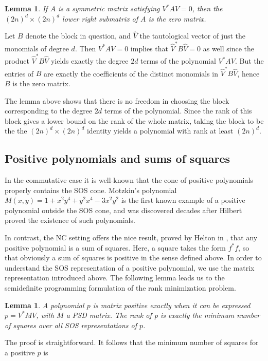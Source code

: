 \documentclass[11pt]{amsart}
\newtheorem{lemma}[theorem]{Lemma}
\begin{document}
\begin{lemma}
If $A$ is a symmetric matrix satisfying $V^*AV=0$, then the $(2n)^d\times (2n)^d$ lower right submatrix of $A$ is the zero matrix.
\end{lemma}

\proof Let $B$ denote the block in question, and $\hat V$ the tautological vector of just the monomials of degree $d$. Then $V^*AV=0$ implies that $\hat V^* B \hat V=0$ as well since the product $\hat V^* B \hat V$ yields exactly the degree $2d$ terms of the polynomial $V^*AV$. But the entries of $B$ are exactly the coefficients of the distinct monomials in $\hat V^*B\hat V$, hence $B$ is the zero matrix.

The lemma above shows that there is no freedom in choosing the block corresponding to the degree $2d$ terms of the polynomial. Since the rank of this block gives a lower bound on the rank of the whole matrix, taking the block to be the the $(2n)^d\times (2n)^d$ identity yields a polynomial with rank at least $(2n)^d$.
\subsection{Positive polynomials and sums of squares}
In the commutative case it is well-known that the cone of positive polynomials properly contains the SOS cone. Motzkin's polynomial $M(x,y)=1+x^2y^4+y^2x^4-3x^2y^2$ is the first known example of a positive polynomial outside the SOS cone, and was discovered decades after Hilbert proved the existence of such polynomials.

In contrast, the NC setting offers the nice result, proved by Helton in \cite{HE}, that any positive polynomial is a sum of squares.  Here, a square takes the form $f^*f$, so that obviously a sum of squares is positive in the sense defined above.  In order to understand the SOS representation of a positive polynomial, we use the matrix representation introduced above.  The following lemma leads us to the semidefinite programming formulation of the rank minimization problem.

\begin{lemma}
A polynomial $p$ is matrix positive exactly when it can be expressed $p=V^*MV$, with $M$ a PSD matrix.  The rank of p is exactly the minimum number of squares over all SOS representations of $p$.
\end{lemma}

The proof is straightforward.  It follows that the minimum number of squares for a positive $p$ is 
\end{document}
